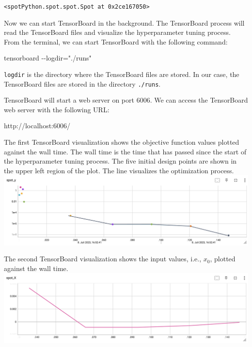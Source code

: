 \documentclass[
  letterpaper,
  DIV=11,
  numbers=noendperiod]{scrreprt}
\newenvironment{Shaded}{\begin{snugshade}}{\end{snugshade}}
\newcommand{\NormalTok}[1]{\textcolor[rgb]{0.00,0.23,0.31}{#1}}
\begin{document}
\begin{verbatim}
<spotPython.spot.spot.Spot at 0x2ce167050>
\end{verbatim}

Now we can start TensorBoard in the background. The TensorBoard process
will read the TensorBoard files and visualize the hyperparameter tuning
process. From the terminal, we can start TensorBoard with the following
command:

\begin{Shaded}
\begin{Highlighting}[]
\NormalTok{tensorboard {-}{-}logdir="./runs"}
\end{Highlighting}
\end{Shaded}

\texttt{logdir} is the directory where the TensorBoard files are stored.
In our case, the TensorBoard files are stored in the directory
\texttt{./runs}.

TensorBoard will start a web server on port 6006. We can access the
TensorBoard web server with the following URL:

\begin{Shaded}
\begin{Highlighting}[]
\NormalTok{http://localhost:6006/}
\end{Highlighting}
\end{Shaded}

The first TensorBoard visualization shows the objective function values
plotted against the wall time. The wall time is the time that has passed
since the start of the hyperparameter tuning process. The five initial
design points are shown in the upper left region of the plot. The line
visualizes the optimization process.
\includegraphics{figures_static/01_tensorboard_01.png}

The second TensorBoard visualization shows the input values, i.e.,
\(x_0\), plotted against the wall time.
\includegraphics{figures_static/01_tensorboard_02.png}
\end{document}
